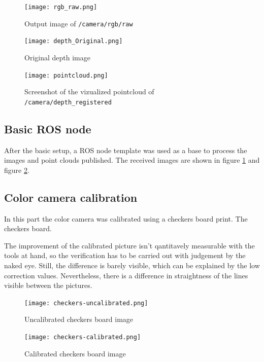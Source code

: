 \documentclass[DIV12,a4paper]{scrartcl}
\begin{document}
\begin{figure}
  \centering
  \texttt{[image: rgb\_raw.png]}
  \caption{Output image of \texttt{/camera/rgb/raw}}
  \label{fig:rgb-raw}
\end{figure}


\begin{figure}[h!tbp]
  \centering
  \texttt{[image: depth\_Original.png]}
  \caption{Original depth image}
  \label{fig:original_depth}
\end{figure}

\begin{figure}[h!tbp]
  \centering
  \texttt{[image: pointcloud.png]}
  \caption{Screenshot of the vizualized pointcloud of \texttt{/camera/depth\_registered}}
  \label{fig:depth_registered}
\end{figure}

\subsection{Basic ROS node}
\label{sec:basic-ros}
After the basic setup, a ROS node template was used as a base to process the images and point clouds published. The received images are shown in figure \ref{fig:rgb-raw} and figure \ref{fig:original_depth}.
\subsection{Color camera calibration}
\label{sec:calibration}
In this part the color camera was calibrated using a checkers board print. The checkers board. %
\par
The improvement of the calibrated picture isn't qantitavely measurable with the tools at hand, so the verification has to be carried out with judgement by the naked eye. Still, the difference is barely visible, which can be explained by the low correction values. %
Nevertheless, there is a difference in straightness of the lines visible between the pictures.
\begin{figure}[h!tbp]
  \centering
  \texttt{[image: checkers-uncalibrated.png]}
  \caption{Uncalibrated checkers board image}
  \label{fig:checkers_board_uncalibrated}
\end{figure}
\begin{figure}[h!tbp]
  \centering
  \texttt{[image: checkers-calibrated.png]}
  \caption{Calibrated checkers board image}
  \label{fig:checkers_board_calibrated}
\end{figure}

\newpage
\end{document}
